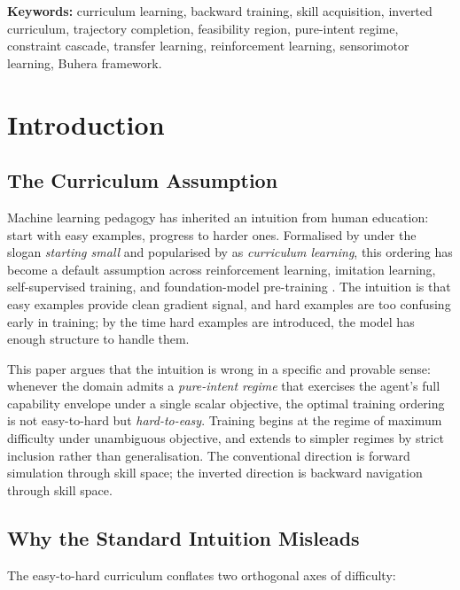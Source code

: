 \documentclass[11pt,twocolumn,a4paper]{article}
\begin{document}
\vspace{6pt}
\noindent\textbf{Keywords:} curriculum learning, backward training, skill acquisition, inverted curriculum, trajectory completion, feasibility region, pure-intent regime, constraint cascade, transfer learning, reinforcement learning, sensorimotor learning, Buhera framework.

\tableofcontents


\section{Introduction}
\label{sec:intro}

\subsection{The Curriculum Assumption}

Machine learning pedagogy has inherited an intuition from human education: start with easy examples, progress to harder ones. Formalised by \citet{elman1993learning} under the slogan \emph{starting small} and popularised by \citet{bengio2009curriculum} as \emph{curriculum learning}, this ordering has become a default assumption across reinforcement learning, imitation learning, self-supervised training, and foundation-model pre-training \cite{soviany2022curriculum,graves2017automated}. The intuition is that easy examples provide clean gradient signal, and hard examples are too confusing early in training; by the time hard examples are introduced, the model has enough structure to handle them.

This paper argues that the intuition is wrong in a specific and provable sense: whenever the domain admits a \emph{pure-intent regime} that exercises the agent's full capability envelope under a single scalar objective, the optimal training ordering is not easy-to-hard but \emph{hard-to-easy}. Training begins at the regime of maximum difficulty under unambiguous objective, and extends to simpler regimes by strict inclusion rather than generalisation. The conventional direction is forward simulation through skill space; the inverted direction is backward navigation through skill space.

\subsection{Why the Standard Intuition Misleads}

The easy-to-hard curriculum conflates two orthogonal axes of difficulty:
\end{document}
